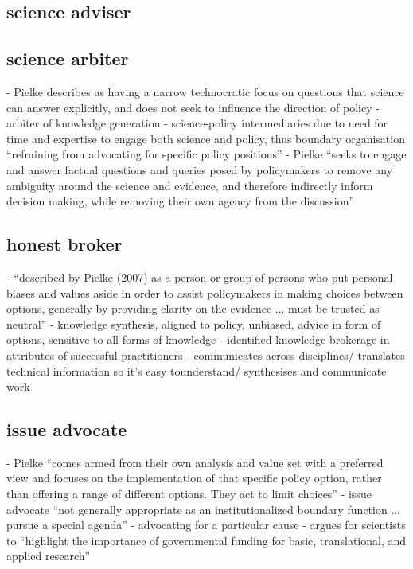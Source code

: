 \subsection{science adviser}
\cite{GluckmanBK2021}

\subsection{science arbiter}
\cite{GluckmanBK2021} - Pielke describes as having a narrow technocratic focus on questions that science can answer explicitly, and does not seek to influence the direction of policy
\cite{BalvaneraJNOBCDGGKKMPSSW2020} - arbiter of knowledge generation
\cite{BednarekSHG2015} - science-policy intermediaries due to need for time and expertise to engage both science and policy, thus boundary organisation ``refraining from advocating for specific policy positions''
\cite{GregoryBW2024} - Pielke ``seeks to engage and answer factual questions and queries posed by policymakers to remove any ambiguity around the science and evidence, and therefore indirectly inform decision making, while removing their own agency from the discussion''


\subsection{honest broker}
\cite{GluckmanBK2021} - ``described by Pielke (2007) as a person or group of persons who put personal biases and values aside in order to assist policymakers in making choices between options, generally by providing clarity on the evidence ... must be trusted as neutral'' - knowledge synthesis, aligned to policy, unbiased, advice in form of options, sensitive to all forms of knowledge
\cite{GogginEtAl2015} - identified knowledge brokerage in attributes of successful practitioners - communicates across disciplines/ translates technical information so it's easy tounderstand/ synthesises and communicate work

\subsection{issue advocate}
\cite{GregoryBW2024} - Pielke ``comes armed from their own analysis and value set with a preferred view and focuses on the implementation of that specific policy option, rather than offering a range of different options. They act to limit choices''
\cite{GluckmanBK2021} - issue advocate ``not generally appropriate as an institutionalized boundary function ... pursue a special agenda''
\cite{BalvaneraJNOBCDGGKKMPSSW2020} - advocating for a particular cause
\cite{ElsensohnACDGGKPRS2019} - argues for scientists to ``highlight the importance of governmental funding for basic, translational, and applied research''

